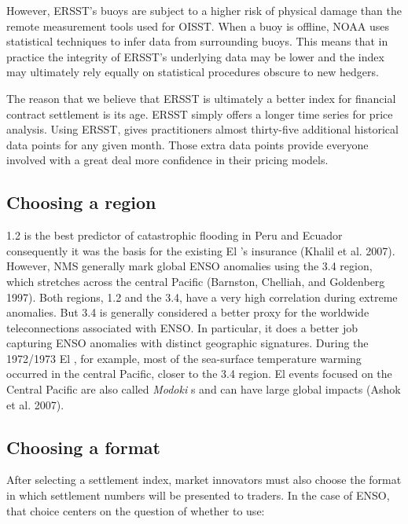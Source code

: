 \documentclass[article]{jss}
\begin{document}
However, ERSST's buoys are subject to a higher risk of physical damage
than the remote measurement tools used for OISST. When a buoy is
offline, NOAA uses statistical techniques to infer data from surrounding
buoys. This means that in practice the integrity of ERSST's underlying
data may be lower and the index may ultimately rely equally on
statistical procedures obscure to new hedgers.

The reason that we believe that ERSST is ultimately a better index for
financial contract settlement is its age. ERSST simply offers a longer
time series for price analysis. Using ERSST, gives practitioners almost
thirty-five additional historical data points for any given month. Those
extra data points provide everyone involved with a great deal more
confidence in their pricing models.

\subsection{Choosing a region}\label{choosing-a-region}

 1.2 is the best predictor of catastrophic flooding in Peru
and Ecuador consequently it was the basis for the existing El
's insurance (Khalil et al. 2007). However, NMS generally
mark global ENSO anomalies using the  3.4 region, which
stretches across the central Pacific (Barnston, Chelliah, and Goldenberg
1997). Both regions,  1.2 and the  3.4, have a
very high correlation during extreme anomalies. But  3.4 is
generally considered a better proxy for the worldwide teleconnections
associated with ENSO. In particular, it does a better job capturing ENSO
anomalies with distinct geographic signatures. During the 1972/1973 El
, for example, most of the sea-surface temperature warming
occurred in the central Pacific, closer to the  3.4 region.
El  events focused on the Central Pacific are also called
\emph{Modoki} s and can have large global impacts (Ashok et
al. 2007).

\subsection{Choosing a format}\label{choosing-a-format}

After selecting a settlement index, market innovators must also choose
the format in which settlement numbers will be presented to traders. In
the case of ENSO, that choice centers on the question of whether to use:
\end{document}
